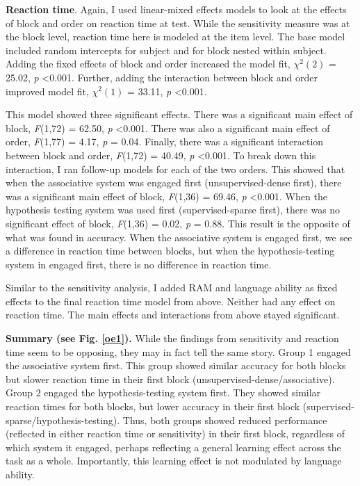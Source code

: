 \documentclass[../dissertation.tex]{subfiles}
\begin{document}
	\textbf{Reaction time}. Again, I used linear-mixed effects models to look at the effects of block and order on reaction time at test. While the sensitivity measure was at the block level, reaction time here is modeled at the item level. The base model included random intercepts for subject and for block nested within subject. Adding the fixed effects of block and order increased the model fit, $\chi^{2}(2)$ = 25.02,  \textit{p} \textless 0.001. Further, adding the interaction between block and order improved model fit, $\chi^{2}(1)$ = 33.11,  \textit{p} \textless 0.001. \par
	This model showed three significant effects. There was a significant main effect of block, \textit{F}(1,72) = 62.50, \textit{p} \textless 0.001. There was also a significant main effect of order, \textit{F}(1,77) = 4.17, \textit{p} = 0.04. Finally, there was a significant interaction between block and order, \textit{F}(1,72) = 40.49, \textit{p} \textless 0.001. To break down this interaction, I ran follow-up models for each of the two orders. This showed that when the associative system was engaged first (unsupervised-dense first), there was a significant main effect of block, \textit{F}(1,36) = 69.46, \textit{p} \textless 0.001. When the hypothesis testing system was used first (supervised-sparse first), there was no significant effect of block, \textit{F}(1,36) = 0.02, \textit{p} = 0.88. This result is the opposite of what was found in accuracy. When the associative system is engaged first, we see a difference in reaction time between blocks, but when the hypothesis-testing system in engaged first, there is no difference in reaction time. \par
	Similar to the sensitivity analysis, I added RAM and language ability as fixed effects to the final reaction time model from above. Neither had any effect on reaction time. The main effects and interactions from above stayed significant. \par 
	\textbf{Summary (see Fig. \ref{oe1}).} While the findings from sensitivity and reaction time seem to be opposing, they may in fact tell the same story. Group 1 engaged the associative system first. This group showed similar accuracy for both blocks but slower reaction time in their first block (unsupervised-dense/associative). Group 2 engaged the hypothesis-testing system first. They showed similar reaction times for both blocks, but lower accuracy in their first block (supervised-sparse/hypothesis-testing). Thus, both groups showed reduced performance (reflected in either reaction time or sensitivity) in their first block, regardless of which system it engaged, perhaps reflecting a general learning effect across the task as a whole. Importantly, this learning effect is not modulated by language ability.
\end{document}
